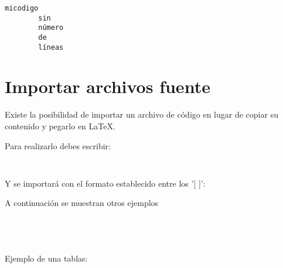\begin{lstlisting}[style=Python,numbers=none,title={Ejemplo de código sin número de líneas}]
		micodigo
		sin
		número
		de
		líneas
\end{lstlisting}

\section{Importar archivos fuente}

Existe la posibilidad de importar un archivo de código en lugar de copiar su contenido y pegarlo en \LaTeX.

Para realizarlo debes escribir:

\begin{lstlisting}[style=Latex-color]
	
\end{lstlisting}

Y se importará con el formato establecido entre los '[ ]':
\newpage


A continuación se muestran otros ejemplos

\begin{lstlisting}[style=Latex-color]
	
\end{lstlisting}

	

\begin{lstlisting}[style=Latex-color]
	
\end{lstlisting}



Ejemplo de una tablas:

